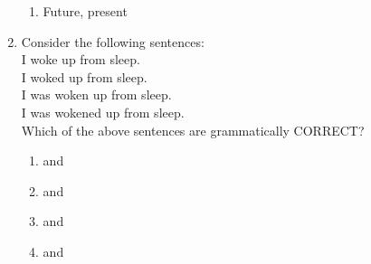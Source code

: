 \documentclass[journal,12pt,onecolumn]{IEEEtran}
\theoremstyle{remark}
\begin{document}
\begin{enumerate}
\begin{enumerate}
    \item Future, present
\end{enumerate}
\item Consider the following sentences:\\
 \; I woke up from sleep.\\
 \; I woked up from sleep.\\
 \;I was woken up from sleep.\\
 \;I was wokened up from sleep.\\
Which of the above sentences are grammatically CORRECT?
\begin{enumerate}
    \item {} and 
    \item {} and 
    \item {} and 
    \item {} and 
\end{enumerate}

\end{enumerate}
\end{document}
